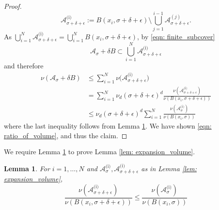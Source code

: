\documentclass[11pt,twoside]{article}
\newtheorem{lemma}{Lemma}
\newcommand{\1}{\mathbf{1}}
\newcommand{\Aset}{\mathcal{A}}
\newcommand{\Asig}{\Aset_{\sigma}}
\begin{document}
\begin{proof}
	\begin{equation*}
	\Aset_{\sigma + \delta + \epsilon}^{\text{(i)}} := B(x_i,\sigma + \delta + \epsilon) \setminus \bigcup_{j = 1}^{i - 1} \Aset_{\sigma + \delta + \epsilon}^{(j)}. \tag{$i = 2,\ldots,N$}
	\end{equation*}
As $\bigcup_{i = 1}^{N} \Aset_{\sigma + \delta + \epsilon}^{\text{(i)}} = \bigcup_{i = 1}^{N} B(x_i,\sigma + \delta + \epsilon)$, by \eqref{eqn: finite_subcover}
	\begin{equation*}
	\Aset_{\sigma} + \delta B \subset \bigcup_{i =1}^{N} \Aset_{\sigma + \delta + \epsilon}^{\text{(i)}}
	\end{equation*}
	and therefore 
	\begin{align*}
	\nu(\Aset_\sigma + \delta B) & \leq \sum_{i = 1}^{N} \nu\bigl(\Aset_{\sigma + \delta + \epsilon}^{\text{(i)}}\bigr) \\
	& = \sum_{i = 1}^{N} \nu_d (\sigma + \delta + \epsilon)^d \frac{\nu(\Aset_{\sigma + \delta + \epsilon}^{\text{(i)}})}{\nu(B(x_i, \sigma + \delta + \epsilon))} \\
	& \leq \nu_d (\sigma + \delta + \epsilon)^d \sum_{i = 1}^{N} \frac{\nu(\Asig^{\text{(i)}})}{\nu(B(x_i,\sigma))}
	\end{align*}
	where the last inequality follows from Lemma \ref{lem: covering}. We have shown \eqref{eqn: ratio_of_volume}, and thus the claim.
\end{proof}
\noindent We require Lemma \ref{lem: covering} to prove Lemma \ref{lem: expansion_volume}.
\begin{lemma}
	\label{lem: covering}
	For $i = 1, \ldots, N$ and  $\Aset_{\sigma}^{\text{(i)}}, \Aset_{\sigma + \delta + \epsilon}^{\text{(i)}}$ as in Lemma \ref{lem: expansion_volume},
	\begin{equation*}
	\frac{\nu(\Aset_{\sigma + \delta + \epsilon}^{\text{(i)}})}{\nu(B(x_i, \sigma + \delta + \epsilon))} \leq \frac{\nu(\Aset_{\sigma}^{\text{(i)}})}{\nu(B(x_i, \sigma))}
	\end{equation*}
\end{lemma}
\end{document}
